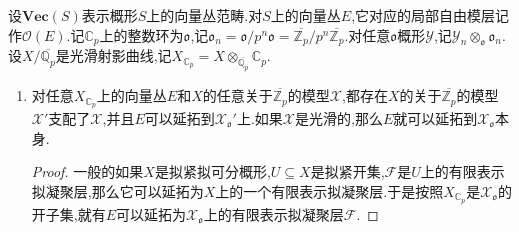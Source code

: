 设$\textbf{Vec}(S)$表示概形$S$上的向量丛范畴.对$S$上的向量丛$E$,它对应的局部自由模层记作$\mathscr{O}(E)$.记$\mathbb{C}_p$上的整数环为$\mathfrak{o}$,记$\mathfrak{o}_n=\mathfrak{o}/p^n\mathfrak{o}=\overline{\mathbb{Z}_p}/p^n\overline{\mathbb{Z}_p}$.对任意$\mathfrak{o}$概形$\mathcal{Y}$,记$\mathcal{Y}_n\otimes_{\mathfrak{o}}\mathfrak{o}_n$.设$X/\overline{\mathbb{Q}_p}$是光滑射影曲线,记$X_{\mathbb{C}_p}=X\otimes_{\overline{\mathbb{Q}_p}}\mathbb{C}_p$.
\begin{enumerate}
	\item 对任意$X_{\mathbb{C}_p}$上的向量丛$E$和$X$的任意关于$\overline{\mathbb{Z}_p}$的模型$\mathcal{X}$,都存在$X$的关于$\overline{\mathbb{Z}_p}$的模型$\mathcal{X}'$支配了$\mathcal{X}$,并且$E$可以延拓到$\mathcal{X}_{\mathfrak{o}}'$上.如果$\mathcal{X}$是光滑的,那么$E$就可以延拓到$\mathcal{X}_{\mathfrak{o}}$本身.
	\begin{proof}
		
		一般的如果$X$是拟紧拟可分概形,$U\subseteq X$是拟紧开集,$\mathscr{F}$是$U$上的有限表示拟凝聚层,那么它可以延拓为$X$上的一个有限表示拟凝聚层.于是按照$X_{\mathbb{C}_p}$是$\mathcal{X}_{\mathfrak{o}}$的开子集,就有$E$可以延拓为$\mathcal{X}_{\mathfrak{o}}$上的有限表示拟凝聚层$\mathscr{F}$.
		
		\qquad
		
		
		

\end{proof}
\end{enumerate}
